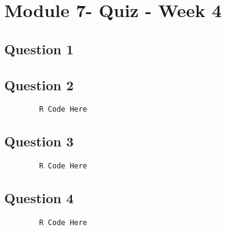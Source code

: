 \documentclass[french]{article}
\begin{document}
	
	\section*{Module 7- Quiz - Week 4}
	\subsection*{Question 1}
	
	\newpage
	\subsection*{Question 2}
	
	\begin{framed}
		\begin{verbatim}
		R Code Here
		\end{verbatim}
	\end{framed}
	\newpage
	\subsection*{Question 3}
	\begin{framed}
		\begin{verbatim}
		R Code Here
		\end{verbatim}
	\end{framed}
	\newpage
	\subsection*{Question 4}
	\begin{framed}
		\begin{verbatim}
		R Code Here
		\end{verbatim}
	\end{framed}
\end{document}
